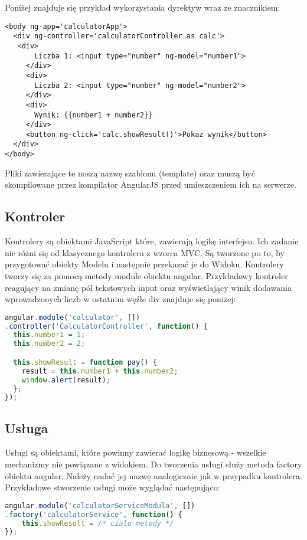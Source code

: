 Poniżej znajduje się przykład wykorzystania dyrektyw wraz ze znacznikiem:

\begin{lstlisting}[language=HTML5]
<body ng-app='calculatorApp'>
  <div ng-controller='calculatorController as calc'>
   <div>
       Liczba 1: <input type="number" ng-model="number1">
     </div>
     <div>
       Liczba 2: <input type="number" ng-model="number2">
     </div>
     <div>
       Wynik: {{number1 + number2}}
     </div>
     <button ng-click='calc.showResult()'>Pokaz wynik</button>
  </div>
</body>
\end{lstlisting}

Pliki zawierające  te noszą nazwę szablonu (template) oraz muszą być skompilowane przez kompilator AngularJS przed umieszczeniem ich na serwerze.

\subsection{Kontroler}
Kontrolery są obiektami JavaScript które, zawierają logikę interfejsu. Ich zadanie nie różni się od klasycznego kontrolera z wzorca MVC. Są tworzone po to, by przygotować obiekty Modelu i następnie przekazać je do Widoku. Kontrolery tworzy się za pomocą metody module obiektu angular. Przykładowy kontroler reagujący na zmianę pól tekstowych input oraz wyświetlający winik dodawania wprowadzonych liczb w ostatnim węźle div znajduje się poniżej:

\begin{lstlisting}[language=JavaScript]
angular.module('calculator', [])
.controller('CalculatorController', function() {
  this.number1 = 1;
  this.number2 = 2;

  this.showResult = function pay() {
  	result = this.number1 + this.number2;
    window.alert(result);
  };
});
\end{lstlisting}


\subsection{Usługa}
Usługi są obiektami, które powinny zawierać logikę biznesową - wszelkie mechanizmy nie powiązane z widokiem. Do tworzenia usługi służy metoda factory obiektu angular. Należy nadać jej nazwę analogicznie jak w przypadku kontrolera. Przykładowe stworzenie usługi może wyglądać następująco:
\begin{lstlisting}[language=JavaScript]
angular.module('calculatorServiceModula', [])
.factory('calculatorService', function() {
	this.showResult = /* cialo metody */
});
\end{lstlisting}

